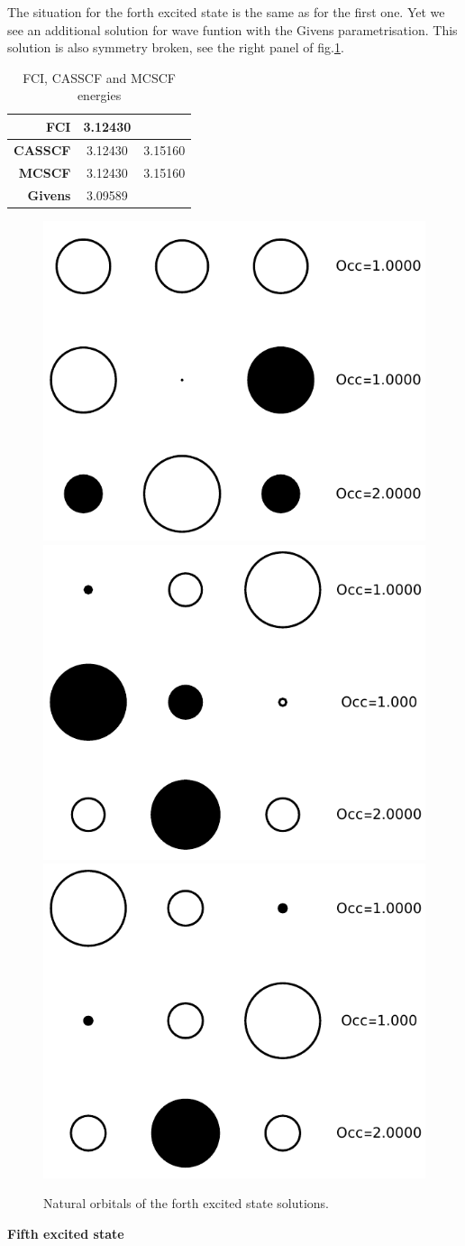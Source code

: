 \documentclass[11pt,a4paper]{article}
\begin{document}
The situation for the forth excited state is the same as for the first one. Yet we see an additional solution for wave funtion with the Givens parametrisation. This solution is also symmetry broken, see the right panel of fig.\ref{fig:H3_ES4_NO}.
\begin{table}
  \begin{center}
    \caption{FCI, CASSCF and MCSCF energies}
    \label{tab:table1}
    \begin{tabular}{r|c c}
      \textbf{FCI} & 3.12430 & \\
      \hline
      \textbf{CASSCF} & 3.12430 & 3.15160 \\
      \hline
      \textbf{MCSCF} & 3.12430 & 3.15160 \\
      \hline
      \textbf{Givens} & 3.09589 &
    \end{tabular}
  \end{center}
\end{table}
\begin{figure}
  \centering
  \includegraphics[width=0.28\linewidth]{Figures/H3_ES4_CAS_NO}
  \hspace{0.65cm}
  \includegraphics[width=0.28\linewidth]{Figures/H3_ES4_MC1_NO}
  \hspace{0.65cm}
  \includegraphics[width=0.28\linewidth]{Figures/H3_ES4_MC2_NO}
  \caption{
    Natural orbitals of the forth excited state solutions.
    \label{fig:H3_ES4_NO}}
\end{figure}

\textbf{Fifth excited state}
\end{document}

